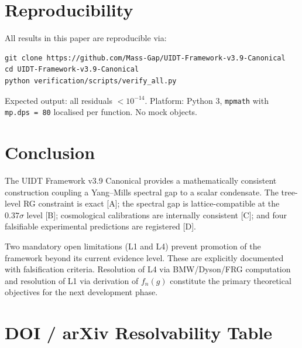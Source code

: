 \documentclass[12pt,a4paper]{article}
\newcommand{\UIDT}{\textsc{UIDT}}
\begin{document}
\section{Reproducibility}
\label{sec:repro}

All results in this paper are reproducible via:
\begin{verbatim}
git clone https://github.com/Mass-Gap/UIDT-Framework-v3.9-Canonical
cd UIDT-Framework-v3.9-Canonical
python verification/scripts/verify_all.py
\end{verbatim}
Expected output: all residuals $< 10^{-14}$. Platform: Python 3, \texttt{mpmath}
with \texttt{mp.dps\,=\,80} localised per function. No mock objects.

\section{Conclusion}
\label{sec:conclusion}

The \UIDT{} Framework v3.9 Canonical provides a mathematically consistent
construction coupling a Yang--Mills spectral gap to a scalar condensate.
The tree-level RG constraint is exact [A]; the spectral gap is lattice-compatible
at the $0.37\sigma$ level [B]; cosmological calibrations are internally consistent
[C]; and four falsifiable experimental predictions are registered [D].

Two mandatory open limitations (L1 and L4) prevent promotion of the framework
beyond its current evidence level. These are explicitly documented with
falsification criteria. Resolution of L4 via BMW/Dyson/FRG computation and
resolution of L1 via derivation of $f_n(g)$ constitute the primary theoretical
objectives for the next development phase.

\appendix

\section{DOI / arXiv Resolvability Table}
\label{app:dois}
\end{document}
